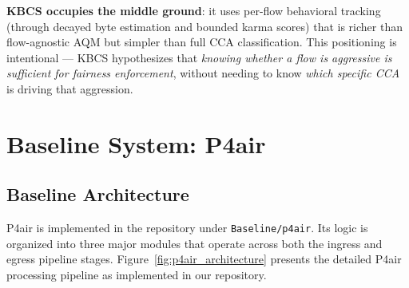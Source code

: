 \documentclass[12pt,a4paper]{report}
\begin{document}
\textbf{KBCS occupies the middle ground}: it uses per-flow behavioral tracking (through decayed byte estimation and bounded karma scores) that is richer than flow-agnostic AQM but simpler than full CCA classification. This positioning is intentional — KBCS hypothesizes that \textit{knowing whether a flow is aggressive is sufficient for fairness enforcement}, without needing to know \textit{which specific CCA} is driving that aggression.

\chapter{Baseline System: P4air}

\section{Baseline Architecture}
P4air is implemented in the repository under \texttt{Baseline/p4air}. Its logic is organized into three major modules that operate across both the ingress and egress pipeline stages. Figure~\ref{fig:p4air_architecture} presents the detailed P4air processing pipeline as implemented in our repository.
\end{document}
